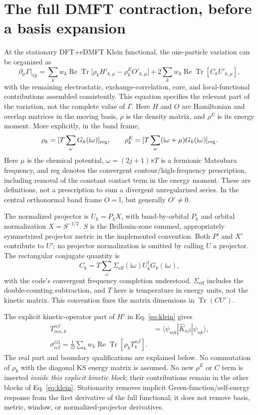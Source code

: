 \documentclass[11pt]{article}
\newcommand{\Tr}{\operatorname{Tr}}
\newcommand{\Rea}{\operatorname{Re}}
\newcommand{\ii}{\mathrm i}
\newcommand{\Id}{\mathbb I}
\begin{document}
\section{The full DMFT contraction, before a basis expansion}
At the stationary DFT+eDMFT Klein functional, the one-particle variation can be organized as
\begin{equation}\label{eq:klein}
 \partial_\mu\Gamma\big|_{\mathrm{1p}}=
 \sum_k w_k\Rea\Tr\big[\rho_k H'_{k,\mu}-\rho^E_k O'_{k,\mu}\big]
 +2\sum_k w_k\Rea\Tr[C_k U'_{k,\mu}],
\end{equation}
with the remaining electrostatic, exchange-correlation, core, and local-functional contributions assembled consistently. This equation specifies the relevant part of the variation, not the complete value of $\Gamma$. Here $H$ and $O$ are Hamiltonian and overlap matrices in the moving basis, $\rho$ is the density matrix, and $\rho^E$ is its energy moment. More explicitly, in the band frame,
\[\rho_k=[T\sum_{\omega}G_k(\ii\omega)]_{\rm reg},\qquad \rho_k^E=[T\sum_{\omega}(\ii\omega+\mu)G_k(\ii\omega)]_{\rm reg}.\]
Here $\mu$ is the chemical potential, $\omega=(2j+1)\pi T$ is a fermionic Matsubara frequency, and reg denotes the convergent contour/high-frequency prescription, including removal of the constant contact term in the energy moment. These are definitions, not a prescription to sum a divergent unregularized series. In the central orthonormal band frame $O=\Id$, but generally $O'\ne0$.

The normalized projector is $U_k=P_kX$, with band-by-orbital $P_k$ and orbital normalization $X=S^{-1/2}$. $S$ is the Brillouin-zone summed, appropriately symmetrized projector metric in the implemented convention. Both $P'$ and $X'$ contribute to $U'$; no projector normalization is omitted by calling $U$ a projector. The rectangular conjugate quantity is
\begin{equation}
 C_k=T\sum_{\omega} \Sigma_{\mathrm{eff}}(\ii\omega)U_k^\dagger G_k(\ii\omega),
\end{equation}
with the code's convergent frequency completion understood. $\Sigma_{\mathrm{eff}}$ includes the double-counting subtraction, and $T$ here is temperature in energy units, not the kinetic matrix. This convention fixes the matrix dimensions in $\Tr(CU')$.

The explicit kinetic-operator part of $H'$ in Eq. \eqref{eq:klein} gives
\begin{align}
 T^{\alpha\beta}_{mn,k}&=\langle\psi_{mk}|\hat K_{\alpha\beta}|\psi_{nk}\rangle,\label{eq:tmn}\\
 \boxed{\sigma^{G1}_{\alpha\beta}=\frac1\Omega\sum_k w_k\Rea\Tr[\rho_k T^{\alpha\beta}_k].}\label{eq:dmft}
\end{align}
The real part and boundary qualifications are explained below. No commutation of $\rho_k$ with the diagonal KS energy matrix is assumed. No new $\rho^E$ or $C$ term is inserted \emph{inside this explicit kinetic block}; their contributions remain in the other blocks of Eq. \eqref{eq:klein}. Stationarity removes implicit Green-function/self-energy response from the first derivative of the full functional; it does not remove basis, metric, window, or normalized-projector derivatives.
\end{document}
